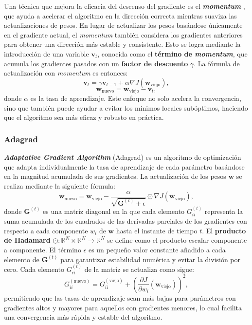 Una técnica que mejora la eficacia del descenso del gradiente es el \textbf{\textit{momentum}} \cite{rumelhart1986learning}, que ayuda a acelerar el algoritmo en la dirección correcta mientras suaviza las actualizaciones de pesos. En lugar de actualizar los pesos basándose únicamente en el gradiente actual, el \textit{momentum} también considera los gradientes anteriores para obtener una dirección más estable y consistente. Esto se logra mediante la introducción de una variable \(\mathbf{v}_t\), conocida como el \textbf{término de \textit{momentum}}, que acumula los gradientes pasados con un \textbf{factor de descuento} \(\gamma\). La fórmula de actualización con \textit{momentum} es entonces:
\begin{equation}
	\mathbf{v}_{t} = \gamma \mathbf{v}_{t-1} + \alpha \nabla J(\mathbf{w}_{\text{viejo}}),
\end{equation}
\begin{equation}
	\mathbf{w}_{\text{nuevo}} = \mathbf{w}_{\text{viejo}} - \mathbf{v}_{t},
\end{equation}
donde \(\alpha\) es la tasa de aprendizaje. Este enfoque no solo acelera la convergencia, sino que también puede ayudar a evitar los mínimos locales subóptimos, haciendo que el algoritmo sea más eficaz y robusto en práctica.


\subsubsection{Adagrad}

\textbf{\textit{Adaptative Gradient Algorithm}} (Adagrad) \cite{duchi2011adaptive} es un algoritmo de optimización que adapta individualmente la tasa de aprendizaje de cada parámetro basándose en la magnitud acumulada de sus gradientes. La actualización de los pesos \(\mathbf{w}\) se realiza mediante la siguiente fórmula:
\[
\mathbf{w}_{\text{nuevo}} = \mathbf{w}_{\text{viejo}} - \frac{\alpha}{\sqrt{\mathbf{G}^{(t)} + \epsilon}} \odot \nabla J(\mathbf{w}_{\text{viejo}}),
\]
donde \( \mathbf{G}^{(t)} \) es una matriz diagonal en la que cada elemento \( G_{ii}^{(t)} \) representa la suma acumulada de los cuadrados de las derivadas parciales de los gradientes con respecto a cada componente \( w_i \) de \(\mathbf{w}\) hasta el instante de tiempo \(t\). El \textbf{producto de Hadamard} \(\odot : \mathbb{R}^N \times \mathbb{R}^N \to \mathbb{R}^N\) se define como el producto escalar componente a componente. El término \( \epsilon \) es un pequeño valor constante añadido a cada elemento de \( \mathbf{G}^{(t)} \) para garantizar estabilidad numérica y evitar la división por cero. Cada elemento \( G_{ii}^{(t)} \) de la matriz se actualiza como sigue:
\[
G_{ii}^{(\text{nuevo})} = G_{ii}^{(\text{viejo})} + \left(\frac{\partial J}{\partial w_i} (\mathbf{w}_{\text{viejo}})\right)^2,
\]
permitiendo que las tasas de aprendizaje sean más bajas para parámetros con gradientes altos y mayores para aquellos con gradientes menores, lo cual facilita una convergencia más rápida y estable del algoritmo.

